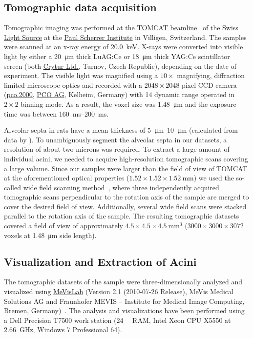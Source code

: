 \documentclass[paper=a4,DIV=calc,abstract,english]{scrartcl}
\begin{document}
\subsection{Tomographic data acquisition}
Tomographic imaging was performed at the \href{http://www.psi.ch/sls/tomcat/}{TOMCAT beamline}~\citep{Stampanoni2006a} of the \href{http://www.psi.ch/sls/}{Swiss Light Source} at the \href{http://www.psi.ch/}{Paul Scherrer Institute} in Villigen, Switzerland.
The samples were scanned at an x-ray energy of \SI{20.0}{\kilo\electronvolt}. X-rays were converted into visible light by either a \SI{20}{\micro\meter} thick LuAG:Ce or \SI{18}{\micro\meter} thick YAG:Ce scintillator screen (both \href{http://www.crytur.cz/}{Crytur Ltd.}, Turnov, Czech Republic), depending on the date of experiment.
The visible light was magnified using a \(10\times\) magnifying, diffraction limited microscope optics and recorded with a \(2048\times2048\) pixel CCD camera (\href{http://www.pco.de/sensitive-cameras/pco2000/}{pco.2000}, \href{http://www.pco.de/}{PCO AG}, Kelheim, Germany) with \SI{14}{\bit} dynamic range operated in \(2\times2\) binning mode.
As a result, the voxel size was \SI{1.48}{\micro\meter} and the exposure time was between \SIrange{160}{200}{\milli\second}.

Alveolar septa in rats have a mean thickness of \SIrange{5}{10}{\micro\meter} (calculated from data by \citet{Burri1974}).
To unambiguously segment the alveolar septa in our datasets, a resolution of about two microns was required.
To extract a large amount of individual acini, we needed to acquire high-resolution tomographic scans covering a large volume.
Since our samples were larger than the field of view of TOMCAT at the aforementioned optical properties (\(1.52\times1.52\times\SI{1.52}{\milli\meter}\)) we used the so-called wide field scanning method~\citep{Haberthuer2010}, where three independently acquired tomographic scans perpendicular to the rotation axis of the sample are merged to cover the desired field of view.
Additionally, several wide field scans were stacked parallel to the rotation axis of the sample.
The resulting tomographic datasets covered a field of view of approximately \(4.5\times4.5\times\SI{4.5}{\milli\meter\cubed}\) (\(3000\times3000\times3072\) voxels at \SI{1.48}{\micro\meter} side length).

\subsection{Visualization and Extraction of Acini}
The tomographic datasets of the sample were three-dimensionally analyzed and visualized using \href{http://mevislab.de}{MeVisLab} (Version 2.1 (2010-07-26 Release), MeVis Medical Solutions AG and Fraunhofer MEVIS -- Institute for Medical Image Computing, Bremen, Germany)~\citep{Bitter2007}.
The analysis and visualizations have been performed using a Dell Precision T7500 work station (\SI{24}{\giga\byte} RAM, Intel Xeon CPU X5550 at \SI{2.66}{\giga\hertz}, Windows 7 Professional \SI{64}{\bit}).
\end{document}
